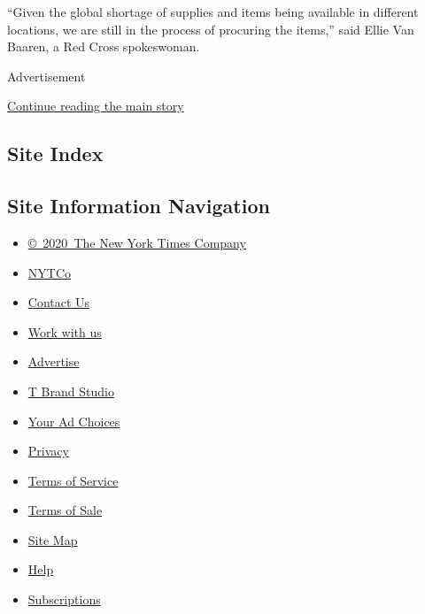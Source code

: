 ​``Given the global shortage of supplies and items being available in
different locations, we are still in the process of procuring the
items,'' said Ellie Van Baaren, a Red Cross spokeswoman.

Advertisement

\protect\hyperlink{after-bottom}{Continue reading the main story}

\hypertarget{site-index}{%
\subsection{Site Index}\label{site-index}}

\hypertarget{site-information-navigation}{%
\subsection{Site Information
Navigation}\label{site-information-navigation}}

\begin{itemize}
\tightlist
\item
  \href{https://help.nytimes3xbfgragh.onion/hc/en-us/articles/115014792127-Copyright-notice}{©~2020~The
  New York Times Company}
\end{itemize}

\begin{itemize}
\tightlist
\item
  \href{https://www.nytco.com/}{NYTCo}
\item
  \href{https://help.nytimes3xbfgragh.onion/hc/en-us/articles/115015385887-Contact-Us}{Contact
  Us}
\item
  \href{https://www.nytco.com/careers/}{Work with us}
\item
  \href{https://nytmediakit.com/}{Advertise}
\item
  \href{http://www.tbrandstudio.com/}{T Brand Studio}
\item
  \href{https://www.nytimes3xbfgragh.onion/privacy/cookie-policy\#how-do-i-manage-trackers}{Your
  Ad Choices}
\item
  \href{https://www.nytimes3xbfgragh.onion/privacy}{Privacy}
\item
  \href{https://help.nytimes3xbfgragh.onion/hc/en-us/articles/115014893428-Terms-of-service}{Terms
  of Service}
\item
  \href{https://help.nytimes3xbfgragh.onion/hc/en-us/articles/115014893968-Terms-of-sale}{Terms
  of Sale}
\item
  \href{https://spiderbites.nytimes3xbfgragh.onion}{Site Map}
\item
  \href{https://help.nytimes3xbfgragh.onion/hc/en-us}{Help}
\item
  \href{https://www.nytimes3xbfgragh.onion/subscription?campaignId=37WXW}{Subscriptions}
\end{itemize}
